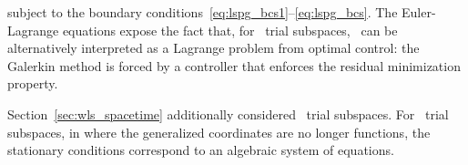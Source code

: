 subject to the boundary conditions~\eqref{eq:lspg_bcs1}--\eqref{eq:lspg_bcs}. The Euler-Lagrange equations expose the fact that, for \spatialAcronym\
trial subspaces, \methodAcronym\ can be alternatively interpreted as a Lagrange problem from optimal control: the Galerkin method is forced by a 
controller that enforces the residual minimization property. 

Section~\ref{sec:wls_spacetime} additionally considered \spaceTimeAcronym\ trial subspaces. For \spaceTimeAcronym\ trial subspaces, in where the generalized coordinates are no longer functions, the stationary conditions correspond to an algebraic system of equations.
